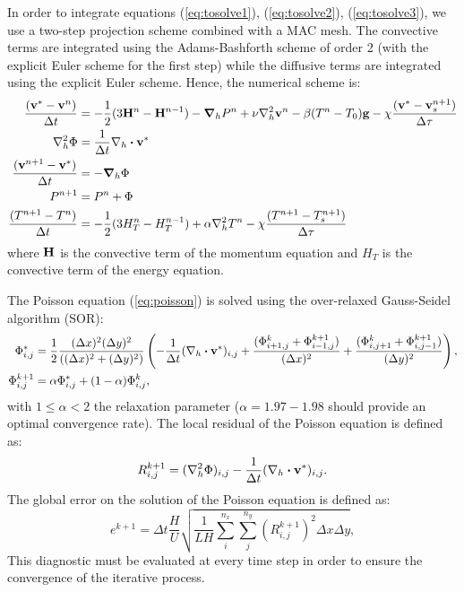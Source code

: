 \documentclass[a4paper,10pt]{scrartcl}
\begin{document}
In order to integrate equations (\ref{eq:tosolve1}), (\ref{eq:tosolve2}), (\ref{eq:tosolve3}), we use a two-step projection scheme combined with a MAC mesh. The convective terms are integrated using the Adams-Bashforth scheme of order 2 (with the explicit Euler scheme for the first step) while the diffusive terms are integrated using the explicit Euler scheme. Hence, the numerical scheme is:
\begin{align}
    \frac{(\vb{v}^*-\vb{v}^n)}{\Delta t} &= -\frac{1}{2}(3\vb{H}^n-\vb{H}^{n-1}) - \grad_hP^n + \nu\laplacian_h\vb{v}^n - \beta(T^n-T_0)\vb{g} - \chi\frac{(\vb{v}^*-\vb{v}_s^{n+1})}{\Delta\tau} \label{eq:flow_solving1}\\
    \laplacian_h\Phi &= \frac{1}{\Delta t}\vb{\nabla}_h\vdot\vb{v}^* \label{eq:poisson}\\
    \frac{(\vb{v}^{n+1}-\vb{v}^*)}{\Delta t} &= -\grad_h\Phi \\
    P^{n+1} &= P^n + \Phi \\
    \frac{(T^{n+1}-T^n)}{\Delta t} &= -\frac{1}{2}(3H^n_T - H^{n-1}_T) + \alpha\laplacian_hT^n - \chi\frac{(T^{n+1}-T_s^{n+1})}{\Delta\tau}
\end{align}
where $\vb{H}$ is the convective term of the momentum equation and $H_T$ is the convective term of the energy equation.

The Poisson equation (\ref{eq:poisson}) is solved using the over-relaxed Gauss-Seidel algorithm (SOR):
\begin{align} 
    \Phi_{i,j}^* &= \frac{1}{2}\frac{(\Delta x)^2(\Delta y)^2}{\left((\Delta x)^2 + (\Delta y)^2\right)}\left(-\frac{1}{\Delta t}(\vb{\nabla}_h\vdot\vb{v}^*)_{i,j} + \frac{(\Phi^k_{i+1,j} + \Phi^{k+1}_{i-1,j})}{(\Delta x)^2} + \frac{(\Phi^k_{i,j+1} + \Phi^{k+1}_{i,j-1})}{(\Delta y)^2}\right), \\
    \Phi^{k+1}_{i,j} &= \alpha\Phi^*_{i,j} + (1-\alpha)\Phi^k_{i,j},
\end{align}
with $1 \leq \alpha < 2$ the relaxation parameter ($\alpha = 1.97 - 1.98$ should provide an optimal convergence rate). The local residual of the Poisson equation is defined as:
\begin{equation} R^{k+1}_{i,j} = (\laplacian_h\Phi)_{i,j} - \frac{1}{\Delta t}(\vb{\nabla}_h\vdot\vb{v}^*)_{i,j}. \end{equation}
The global error on the solution of the Poisson equation is defined as:
\begin{equation} e^{k+1} = \Delta t\frac{H}{U}\sqrt{\frac{1}{LH}\sum_i^{n_x}\sum_j^{n_y}(R_{i,j}^{k+1})^2\Delta x \Delta y}, \end{equation}
This diagnostic must be evaluated at every time step in order to ensure the convergence of the iterative process.
\end{document}
